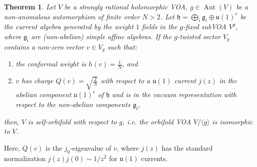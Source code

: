 \documentclass[11pt,reqno]{article}
\DeclareMathOperator{\Aut}{Aut}
\newcommand{\alg}[1]{\mathfrak{#1}}
\newtheorem{theorem}{Theorem}
\begin{document}
\begin{theorem}\label{th:invparaf}
	Let $V$ be a strongly rational holomorphic VOA, $g\in \Aut(V)$ be a non-anomalous automorphism of finite order $N>2$. Let $\alg{h}=\bigoplus_i \alg{g}_{i}\oplus \alg{u}(1)^r$ be the current algebra generated by the weight $1$ fields in the $g$-fixed subVOA $V^g$, where $\alg{g_i}$ are (non-abelian) simple affine algebras. If the $g$-twisted sector $V_g$ contains a non-zero vector $v\in V_g$ such that:
	\begin{enumerate}
		\item the conformal weight is $h(v)=\frac{1}{N}$,
		 and
		\item $v$ has charge $Q(v)=\sqrt{\frac{2}{N}}$ with respect to a $\alg{u}(1)$ current $j(z)$ in the abelian component $\alg{u}(1)^r$ of $\alg{h}$ and is in the vacuum representation with respect to the non-abelian components $\alg{g_i}$,
	\end{enumerate} then, $V$ is self-orbifold with respect to $g$, i.e. the orbifold VOA $V/\langle g\rangle$ is isomorphic to $V$. 
\end{theorem}
Here, $Q(v)$ is the $j_0$-eigenvalue of $v$, where $j(z)$ has the standard normalization $j(z)j(0)\sim 1/z^2$ for $\alg{u}(1)$ currents.
\end{document}
